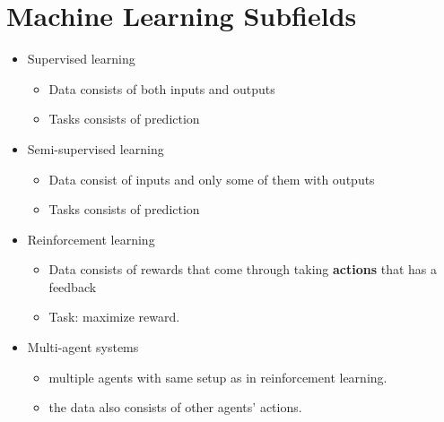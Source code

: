 \documentclass[letterpaper,10pt]{article}
\begin{document}
\section{Machine Learning Subfields}

\begin{itemize}
	\item Supervised learning
	\begin{itemize}
		\item Data consists of both inputs and outputs
		\item Tasks consists of prediction
	\end{itemize}
	\item Semi-supervised learning
	\begin{itemize}
		\item Data consist of inputs and only some of them with outputs
		\item Tasks consists of prediction
	\end{itemize}
	\item Reinforcement learning
	\begin{itemize}
		\item Data consists of rewards that come through taking \textbf{actions} that has a feedback
		\item Task: maximize reward.
	\end{itemize}
	\item Multi-agent systems
	\begin{itemize}
		\item multiple agents with same setup as in reinforcement learning.
		\item the data also consists of other agents' actions.
	\end{itemize}
\end{itemize}
\end{document}
